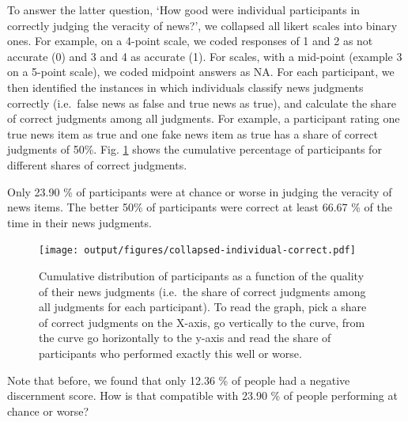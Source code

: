 \documentclass[
  doc,floatsintext]{apa6}
\begin{document}
To answer the latter question, `How good were individual participants in correctly judging the veracity of news?', we collapsed all likert scales into binary ones. For example, on a 4-point scale, we coded responses of 1 and 2 as not accurate (0) and 3 and 4 as accurate (1). For scales, with a mid-point (example 3 on a 5-point scale), we coded midpoint answers as NA. For each participant, we then identified the instances in which individuals classify news judgments correctly (i.e.~false news as false and true news as true), and calculate the share of correct judgments among all judgments. For example, a participant rating one true news item as true and one fake news item as true has a share of correct judgments of 50\%. Fig. \ref{fig:collapsed-individual-correct} shows the cumulative percentage of participants for different shares of correct judgments.

Only 23.90 \% of participants were at chance or worse in judging the veracity of news items. The better 50\% of participants were correct at least 66.67 \% of the time in their news judgments.



\begin{figure}
\centering
\texttt{[image: output/figures/collapsed-individual-correct.pdf]}
\caption{\label{fig:collapsed-individual-correct}Cumulative distribution of participants as a function of the quality of their news judgments (i.e.~the share of correct judgments among all judgments for each participant). To read the graph, pick a share of correct judgments on the X-axis, go vertically to the curve, from the curve go horizontally to the y-axis and read the share of participants who performed exactly this well or worse.}
\end{figure}

Note that before, we found that only 12.36 \% of people had a negative discernment score. How is that compatible with 23.90 \% of people performing at chance or worse?
\end{document}
